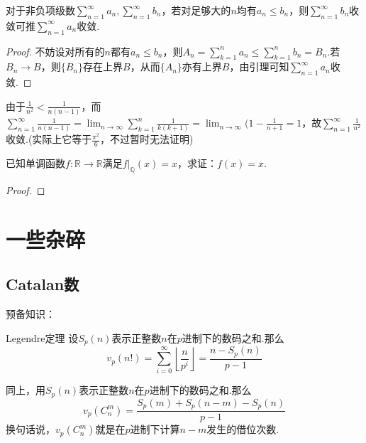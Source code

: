 \documentclass[lang=cn, zihao=5]{elegantbook}
\newcommand{\R}{\mathbb{R}}
\begin{document}
\begin{proposition}
	对于非负项级数$\sum_{n=1}^{\infty} a_n,\sum_{n=1}^{\infty} b_n$，若对足够大的$n$均有$a_n \leq b_n$，则$\sum_{n=1}^{\infty} b_n$收敛可推$\sum_{n=1}^{\infty} a_n$收敛.
\end{proposition}
\begin{proof}
	不妨设对所有的$n$都有$a_n \leq b_n$，则$A_n = \sum_{k=1}^{n} a_n \leq \sum_{k=1}^n b_n = B_n$.若$B_n \to B$，则$\{ B_n \}$存在上界$B$，从而$\{ A_n \}$亦有上界$B$，由引理可知$\sum_{n=1}^{\infty} a_n$收敛.
\end{proof}

\begin{example}
	由于$\frac{1}{n^2}<\frac{1}{n(n-1)}$，而$\sum_{n=1}^{\infty}\frac{1}{n(n-1)} = \lim_{n\to \infty} \sum_{k=1}^{n} \frac{1}{k(k+1)} = \lim_{n\to \infty} (1-\frac{1}{n+1}=1$，故$\sum_{n=1}^{\infty} \frac{1}{n^2}$收敛.(实际上它等于$\frac{\pi ^2}{6}$，不过暂时无法证明)
\end{example}



\newpage

\begin{exercise}
	已知单调函数$f:\R \to \R$满足$f|_{\mathbb{Q}}(x)=x$，求证：$f(x)=x$.
\end{exercise}
\begin{proof}
	
\end{proof}



\setcounter{chapter}{0}
\part{一些杂碎}

\chapter*{Catalan数}

预备知识：

\begin{theorem}{Legendre定理}
	设$S_p(n)$表示正整数$n$在$p$进制下的数码之和.那么$$v_p(n!) = \sum_{i=0}^{\infty} \left\lfloor \frac{n}{p^i} \right\rfloor = \frac{n-S_p(n)}{p-1}$$
\end{theorem}

\begin{corollary}
	同上，用$S_p(n)$表示正整数$n$在$p$进制下的数码之和.那么$$v_p(C_n^m) = \frac{S_p(m)+S_p(n-m)-S_p(n)}{p-1}$$
	换句话说，$v_p(C_n^m)$就是在$p$进制下计算$n-m$发生的借位次数.
\end{corollary}
\end{document}
